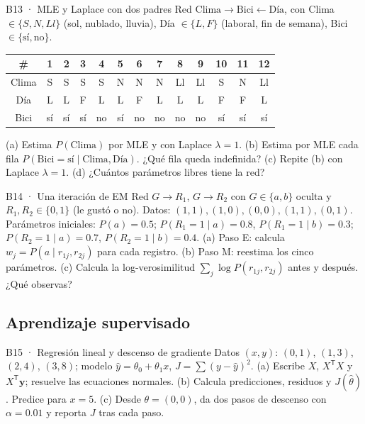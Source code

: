 \begin{ejercicio}{B13 · MLE y Laplace con dos padres }
Red $\text{Clima}\to\text{Bici}\leftarrow\text{Día}$, con Clima $\in\{S,N,Ll\}$ (sol, nublado, lluvia), Día $\in\{L,F\}$ (laboral, fin de semana), Bici $\in\{\text{sí},\text{no}\}$.
\begin{center}\small
\begin{tabular}{c|cccccccccccc}
\# & 1&2&3&4&5&6&7&8&9&10&11&12\\\hline
Clima & S&S&S&S&N&N&N&Ll&Ll&S&N&Ll\\
Día & L&L&F&L&L&F&L&L&L&F&F&L\\
Bici & sí&sí&sí&no&sí&no&no&no&no&sí&sí&sí
\end{tabular}
\end{center}
(a) Estima $P(\text{Clima})$ por MLE y con Laplace $\lambda=1$.
(b) Estima por MLE cada fila $P(\text{Bici}=\text{sí}\mid\text{Clima},\text{Día})$. ¿Qué fila queda indefinida?
(c) Repite (b) con Laplace $\lambda=1$. (d) ¿Cuántos parámetros libres tiene la red?
\end{ejercicio}

\begin{ejercicio}{B14 · Una iteración de EM }
Red $G\to R_1$, $G\to R_2$ con $G\in\{a,b\}$ oculta y $R_1,R_2\in\{0,1\}$ (le gustó o no). Datos:
$(1,1),(1,0),(0,0),(1,1),(0,1)$. Parámetros iniciales: $P(a)=0.5$; $P(R_1{=}1\mid a)=0.8$, $P(R_1{=}1\mid b)=0.3$;
$P(R_2{=}1\mid a)=0.7$, $P(R_2{=}1\mid b)=0.4$.
(a) Paso E: calcula $w_j=P(a\mid r_{1j},r_{2j})$ para cada registro.
(b) Paso M: reestima los cinco parámetros.
(c) Calcula la log-verosimilitud $\sum_j\log P(r_{1j},r_{2j})$ antes y después. ¿Qué observas?
\end{ejercicio}

\subsection{Aprendizaje supervisado}

\begin{ejercicio}{B15 · Regresión lineal y descenso de gradiente }
Datos $(x,y)$: $(0,1)$, $(1,3)$, $(2,4)$, $(3,8)$; modelo $\hat y=\theta_0+\theta_1x$, $J=\sum(y-\hat y)^2$.
(a) Escribe $X$, $X^\mathsf TX$ y $X^\mathsf T\mathbf y$; resuelve las ecuaciones normales.
(b) Calcula predicciones, residuos y $J(\hat\theta)$. Predice para $x=5$.
(c) Desde $\theta=(0,0)$, da dos pasos de descenso con $\alpha=0.01$ y reporta $J$ tras cada paso.
\end{ejercicio}

